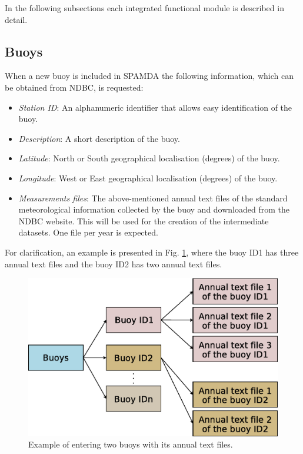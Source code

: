 \documentclass[review]{elsarticle}
\begin{document}
		In the following subsections each integrated functional module is described in detail.

			\subsection{Buoys}\label{sec:Buoys}
			
				When a new buoy is included in SPAMDA the following information, which can be obtained from NDBC, is requested:
				\begin{itemize}
					\item \textit{Station ID}: An alphanumeric identifier that allows easy identification of the buoy.
					\item \textit{Description}: A short description of the buoy.
					\item \textit{Latitude}: North or South geographical localisation (degrees) of the buoy.
					\item \textit{Longitude}: West or East geographical localisation (degrees) of the buoy.
					\item \textit{Measurements files}: The above-mentioned annual text files of the standard meteorological information collected by the buoy and downloaded from the NDBC website. This will be used for the creation of the intermediate datasets. One file per year is expected.
				\end{itemize}
				
				For clarification, an example is presented in Fig. \ref{fig:buoys}, where the buoy ID1 has three annual text files and the buoy ID2 has two annual text files.
				
				\begin{figure}[ht!]
					\centering
					\includegraphics[scale=0.42]{figures/FigureBuoys.eps}
					\caption{Example of entering two buoys with its annual text files.}
					\label{fig:buoys}
				\end{figure}
\end{document}

